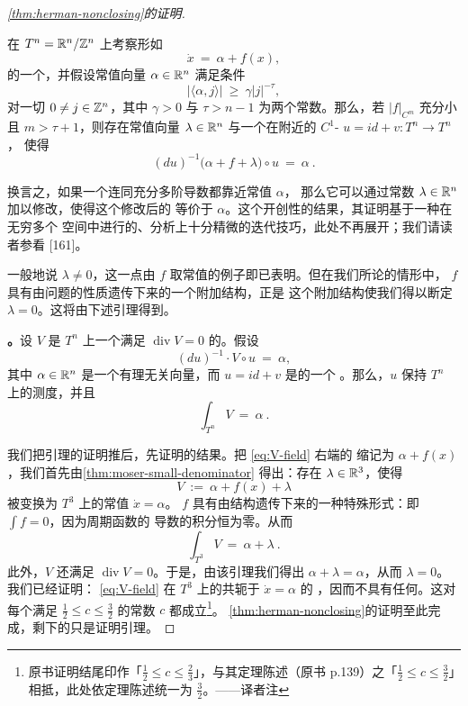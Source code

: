 \begin{proof}[\cref*{thm:herman-nonclosing}的证明]
\begin{theorem}\label{thm:moser-small-denominator}
在\trTorus{} $T^{n}=\mathbb{R}^{n}/\mathbb{Z}^{n}$ 上考察形如
\[
\dot{x}\ =\ \alpha+f(x),
\]
的一个\trVectorField，并假设常值向量 $\alpha\in\mathbb{R}^{n}$ 满足\trDiophantine{}条件
\[
\bigl\lvert\langle\alpha,j\rangle\bigr\rvert\ \geq\ \gamma\lvert j\rvert^{-\tau},
\]
对一切 $0\neq j\in\mathbb{Z}^{n}$，其中 $\gamma>0$ 与 $\tau>n-1$ 为两个常数。那么，若%
$\lvert f\rvert_{C^{m}}$ 充分小且 $m>\tau+1$，则存在常值向量 $\lambda\in\mathbb{R}^{n}$%
与一个在\trIdentityMap{}附近的 $C^{1}$-\trDiffeomorphism{} $u=id+v:T^{n}\to T^{n}$，%
使得
\[
(du)^{-1}\bigl(\alpha+f+\lambda\bigr)\circ u\ =\ \alpha\ .
\]
\end{theorem}

换言之，如果一个\trVectorField{}连同充分多阶导数都靠近常值\trVectorField{} $\alpha$，%
那么它可以通过常数 $\lambda\in\mathbb{R}^{n}$ 加以修改，使得这个修改后的\trVectorField{}%
等价于 $\alpha$。这个开创性的\trSmallDenominator{}结果，其证明基于一种在无穷多个%
空间中进行的、分析上十分精微的迭代技巧，此处不再展开；我们请读者参看 [161]。

一般地说 $\lambda\neq0$，这一点由 $f$ 取常值的例子即已表明。但在我们所论的情形中，%
\trVectorField{} $f$ 具有由问题的\trHamiltonian{}性质遗传下来的一个附加结构，正是%
这个附加结构使我们得以断定 $\lambda=0$。这将由下述引理得到。

\textbf{\trhLemma{}。}\quad 设 $V$ 是\trTorus{} $T^{n}$ 上一个满足%
$\operatorname{div}V=0$ 的\trVectorField。假设
\[
(du)^{-1}\cdot V\circ u\ =\ \alpha,
\]
其中 $\alpha\in\mathbb{R}^{n}$ 是一个有理无关向量，而 $u=id+v$ 是\trTorus{}的一个%
\trDiffeomorphism。那么，$u$ 保持 $T^{n}$ 上的\trLebesgue{}测度，并且
\[
\int_{T^{n}}V\ =\ \alpha\ .
\]

我们把引理的证明推后，先证明\trHerman{}的结果。把 \eqref{eq:V-field} 右端的%
\trVectorField{}缩记为 $\alpha+f(x)$，我们首先由\cref{thm:moser-small-denominator}%
得出：存在 $\lambda\in\mathbb{R}^{3}$，使得\trVectorField
\[
V\ :=\ \alpha+f(x)+\lambda
\]
被变换为 $T^{3}$ 上的常值\trVectorField{} $\dot{x}=\alpha$。\trVectorField{} $f$%
具有由\trHamiltonian{}结构遗传下来的一种特殊形式：即 $\int f=0$，因为周期函数的%
导数的积分恒为零。从而
\[
\int_{T^{3}}V\ =\ \alpha+\lambda\ .
\]
此外，$V$ 还满足 $\operatorname{div}V=0$。于是，由该引理我们得出%
$\alpha+\lambda=\alpha$，从而 $\lambda=0$。我们已经证明：\trVectorField{}%
\eqref{eq:V-field} 在 $T^{3}$ 上的\trFlow{}共轭于 $\dot{x}=\alpha$ 的%
\trLinear\trFlow，因而不具有任何\trPeriodicSolution。这对每个满足%
$\tfrac{1}{2}\leq c\leq\tfrac{3}{2}$ 的常数 $c$ 都成立\footnote{原书证明结尾印作「$\tfrac{1}{2}\leq c\leq\tfrac{2}{3}$」，与其定理陈述（原书 p.139）之「$\tfrac{1}{2}\leq c\leq\tfrac{3}{2}$」相抵，此处依定理陈述统一为 $\tfrac{3}{2}$。——译者注}。%
\cref{thm:herman-nonclosing}的证明至此完成，剩下的只是证明引理。


\end{proof}
